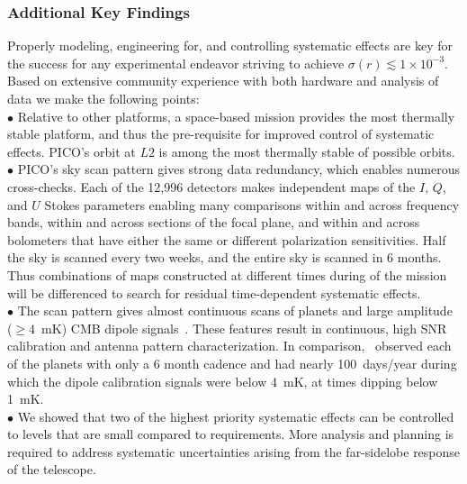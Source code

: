 \documentclass[PICOReport.tex]{subfiles}
\begin{document}
\subsubsection{Additional Key Findings}
\label{sec:systematics_key}

Properly modeling, engineering for, and controlling systematic effects are key for the success for any experimental endeavor striving to achieve $\sigma(r) \lesssim 1 \times 10^{-3}$. Based on extensive community experience with both hardware and analysis of data we make the following points: \\
$\bullet$ \hspace{0.1in}  Relative to other platforms, a space-based mission provides the most thermally stable platform, and thus the pre-requisite for improved control of systematic effects. PICO's orbit at $L2$ is among the most thermally stable of possible orbits. \\
$\bullet$ \hspace{0.1in} PICO's sky scan pattern gives strong data redundancy, which enables numerous cross-checks. Each of the 12,996 detectors makes independent maps of the $I,\,Q$, and $U$ Stokes parameters enabling many comparisons within and across frequency bands, within and across sections of the focal plane, and within and across bolometers that have either the same or different polarization sensitivities. Half the sky is scanned every two weeks, and the entire sky is scanned in 6 months. Thus combinations of maps constructed at different times during of the mission will be differenced to search for residual time-dependent systematic effects. \\
$\bullet$ \hspace{0.1in}  The scan pattern gives almost continuous scans of planets and large amplitude ($\geq 4$~mK) CMB dipole signals~\citep{picoweb_dipole}. These features result in continuous, high \ac{SNR} calibration and antenna pattern characterization. In comparison, \planck\ observed each of the planets with only a 6 month cadence and had nearly 100~days/year during which the dipole calibration signals were below 4~mK, at times dipping below 1~mK. \\
$\bullet$ \hspace{0.1in}  We showed that two of the highest priority systematic effects can be controlled to levels that are small compared to requirements. More analysis and planning is required to address systematic uncertainties arising from the far-sidelobe response of the telescope. 
\end{document}
